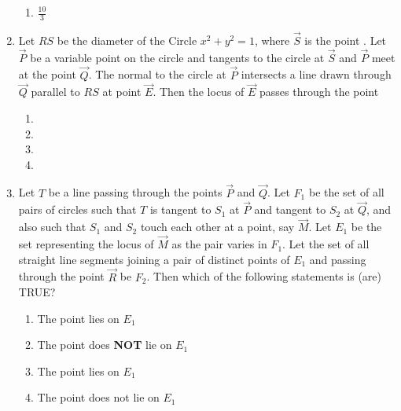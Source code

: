 \begin{enumerate}[label=\thesubsection.\arabic*.,ref=\thesubsection.\theenumi]
\begin{multicols}{2}
\begin{enumerate}[label=(\alph*),  start=16, itemsep=1ex]
 \item $\frac{10}{3}$                         
 \end{enumerate}
\end{multicols}
%
\item Let $RS$ be the diameter of the Circle $x^{2} + y^{2} = 1$,  where $\vec{S}$ is the point . Let $\vec{P}$ be a variable point  on the circle and tangents to the circle at $\vec{S}$ and $\vec{P}$ meet at the point $\vec{Q}$. The normal to the circle at $\vec{P}$ intersects a line drawn through $\vec{Q}$ parallel to $RS$ at point $\vec{E}$. Then the locus of $\vec{E}$ passes through the point
%

\hfill {}
\begin{multicols}{4}
\begin{enumerate}
	\item {}
	\item {}
	\item {}
	\item {}
\end{enumerate}
\end{multicols}
\item Let $T$ be a line passing through the points $\vec{P}$ and $\vec{Q}$. Let $F_1$ be the set of all pairs of circles  such that $T$ is tangent to $S_1$ at $\vec{P}$ and tangent to $S_2$ at $\vec{Q}$,  and also such that $S_1$ and $S_2$ touch each other at a point,  say $\vec{M}$. Let $E_1$ be the set representing the locus of $\vec{M}$ as the pair  varies in $F_1$. Let the set of all straight line segments joining a pair of distinct points of $E_1$ and passing through the point $\vec{R}$ be $F_2$. Then which of the following statements is (are) TRUE?
%
\hfill{}
\begin{multicols}{2}
\begin{enumerate}
\item The point  lies on $E_1$
\item The point  does \textbf{NOT} lie on $E_1$
\item The point  lies on $E_1$
\item The point  does not lie on $E_1$
\end{enumerate}

\end{multicols}
\end{enumerate}
